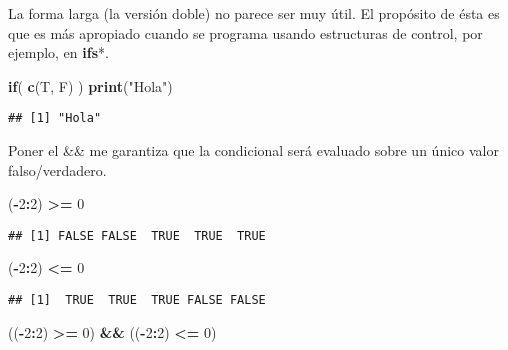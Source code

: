 \documentclass[]{article}
\newenvironment{Shaded}{\begin{snugshade}}{\end{snugshade}}
\newcommand{\KeywordTok}[1]{\textcolor[rgb]{0.13,0.29,0.53}{\textbf{#1}}}
\newcommand{\DecValTok}[1]{\textcolor[rgb]{0.00,0.00,0.81}{#1}}
\newcommand{\StringTok}[1]{\textcolor[rgb]{0.31,0.60,0.02}{#1}}
\newcommand{\ControlFlowTok}[1]{\textcolor[rgb]{0.13,0.29,0.53}{\textbf{#1}}}
\newcommand{\OperatorTok}[1]{\textcolor[rgb]{0.81,0.36,0.00}{\textbf{#1}}}
\newcommand{\NormalTok}[1]{#1}
\begin{document}
La forma larga (la versión doble) no parece ser muy útil. El propósito
de ésta es que es más apropiado cuando se programa usando estructuras de
control, por ejemplo, en \textbf{ifs}*.

\begin{Shaded}
\begin{Highlighting}[]
\ControlFlowTok{if}\NormalTok{( }\KeywordTok{c}\NormalTok{(T, F) ) }\KeywordTok{print}\NormalTok{(}\StringTok{"Hola"}\NormalTok{)}
\end{Highlighting}
\end{Shaded}

\begin{verbatim}
## [1] "Hola"
\end{verbatim}

Poner el \&\& me garantiza que la condicional será evaluado sobre un
único valor falso/verdadero.

\begin{Shaded}
\begin{Highlighting}[]
\NormalTok{(}\OperatorTok{-}\DecValTok{2}\OperatorTok{:}\DecValTok{2}\NormalTok{) }\OperatorTok{>=}\StringTok{ }\DecValTok{0} 
\end{Highlighting}
\end{Shaded}

\begin{verbatim}
## [1] FALSE FALSE  TRUE  TRUE  TRUE
\end{verbatim}

\begin{Shaded}
\begin{Highlighting}[]
\NormalTok{(}\OperatorTok{-}\DecValTok{2}\OperatorTok{:}\DecValTok{2}\NormalTok{) }\OperatorTok{<=}\StringTok{ }\DecValTok{0}
\end{Highlighting}
\end{Shaded}

\begin{verbatim}
## [1]  TRUE  TRUE  TRUE FALSE FALSE
\end{verbatim}

\begin{Shaded}
\begin{Highlighting}[]
\NormalTok{((}\OperatorTok{-}\DecValTok{2}\OperatorTok{:}\DecValTok{2}\NormalTok{) }\OperatorTok{>=}\StringTok{ }\DecValTok{0}\NormalTok{) }\OperatorTok{&&}\StringTok{ }\NormalTok{((}\OperatorTok{-}\DecValTok{2}\OperatorTok{:}\DecValTok{2}\NormalTok{) }\OperatorTok{<=}\StringTok{ }\DecValTok{0}\NormalTok{)}
\end{Highlighting}
\end{Shaded}
\end{document}
